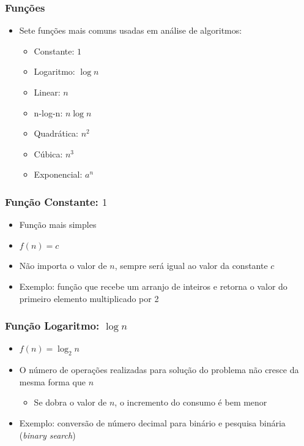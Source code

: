 \documentclass[aspectratio=169]{beamer}
\begin{document}
\begin{frame}\frametitle{Funções}
\begin{itemize}
	\item Sete funções mais comuns usadas em análise de algoritmos:
	\begin{itemize}
		\item Constante: $1$
		\item Logaritmo: $\log n$
		\item Linear: $n$
		\item n-log-n: $n \log n$
		\item Quadrática: $n^2$
		\item Cúbica: $n^3$
		\item Exponencial: $a^n$
	\end{itemize}
\end{itemize}
\end{frame}

\begin{frame}\frametitle{Função Constante: $1$}
\begin{itemize}
	\item Função mais simples
	\item $f(n) = c$
	\item Não importa o valor de $n$, sempre será igual ao valor da constante $c$
	\item Exemplo: função que recebe um arranjo de inteiros e retorna o valor do primeiro elemento multiplicado por 2
\end{itemize}
\end{frame}

\begin{frame}\frametitle{Função Logaritmo: $\log n$}
\begin{itemize}
	\item $f(n) = \log_{2}n$
	\item O número de operações realizadas para solução do problema não cresce da mesma forma que $n$
	\begin{itemize}
		\item Se dobra o valor de $n$, o incremento do consumo é bem menor
	\end{itemize}
	\item Exemplo: conversão de número decimal para binário e pesquisa binária (\emph{binary search})
\end{itemize}
\end{frame}
\end{document}
